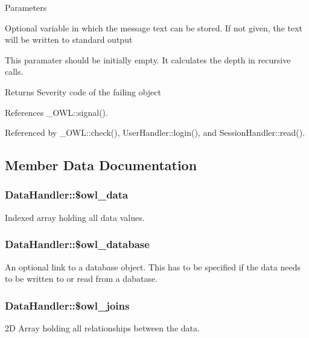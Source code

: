 \begin{DoxyParams}{Parameters}
\item[\mbox{\tt[out]} {\em \$text}]Optional variable in which the message text can be stored. If not given, the text will be written to standard output \item[\mbox{\tt[in]} {\em \$depth}]This paramater should be initially empty. It calculates the depth in recursive calls. \end{DoxyParams}
\begin{DoxyReturn}{Returns}
Severity code of the failing object 
\end{DoxyReturn}


References \_\-OWL::signal().



Referenced by \_\-OWL::check(), UserHandler::login(), and SessionHandler::read().



\subsection{Member Data Documentation}
\subsubsection[{\$owl\_\-data}]{\setlength{\rightskip}{0pt plus 5cm}DataHandler::\$owl\_\-data}\label{classDataHandler_a329b5524c379e0db6c4d5ce59f3c414f}
Indexed array holding all data values. 
\subsubsection[{\$owl\_\-database}]{\setlength{\rightskip}{0pt plus 5cm}DataHandler::\$owl\_\-database}\label{classDataHandler_a3ac49aa018e0ebe4c74f5a636d455a8b}
An optional link to a database object. This has to be specified if the data needs to be written to or read from a dabatase. 
\subsubsection[{\$owl\_\-joins}]{\setlength{\rightskip}{0pt plus 5cm}DataHandler::\$owl\_\-joins}\label{classDataHandler_ada9b697f81ea82d269077f9c7445791d}
2D Array holding all relationships between the data. 
